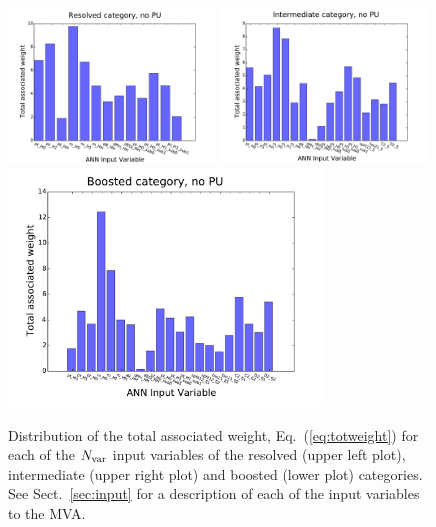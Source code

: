\begin{figure}[t]
  \begin{center}
    \includegraphics[width=0.49\textwidth]{plots/res_wgthist_noPU.pdf}
\includegraphics[width=0.49\textwidth]{plots/int_wgthist_noPU.pdf}
\includegraphics[width=0.75\textwidth]{plots/bst_wgthist_noPU.pdf}
\vspace{-0.5cm}
\caption{\small
Distribution of the total associated weight,
Eq.~(\ref{eq:totweight}) for each of the $N_{\rm var}$ input
variables of the resolved (upper left plot),  intermediate (upper right plot)
and boosted (lower plot)
categories.
%
See Sect.~\ref{sec:input} for a description of each of the input
variables to the MVA.
}
\label{fig:nnweights}
\end{center}
\end{figure}




